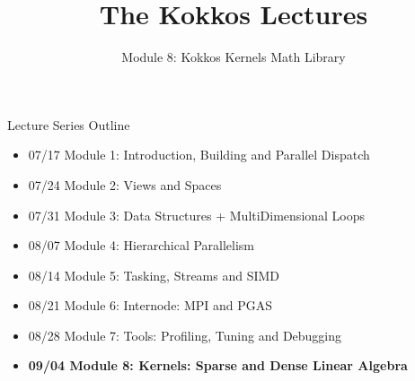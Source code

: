
\def\sandid{SAND2020-9315 TR}

\title{The Kokkos Lectures}

\author{Module 8: Kokkos Kernels Math Library}




\shortfalse
\mediumtrue
\fulltrue
\notoverviewtrue



\begin{frame}
	\titlepage
\end{frame}



\begin{frame}[fragile]{Lecture Series Outline}

\begin{itemize}
        \item 07/17 Module 1: Introduction, Building and Parallel Dispatch
        \item 07/24 Module 2: Views and Spaces
        \item 07/31 Module 3: Data Structures + MultiDimensional Loops
        \item 08/07 Module 4: Hierarchical Parallelism
        \item 08/14 Module 5: Tasking, Streams and SIMD
        \item 08/21 Module 6: Internode: MPI and PGAS
        \item 08/28 Module 7: Tools: Profiling, Tuning and Debugging
        \item \textbf{09/04 Module 8: Kernels: Sparse and Dense Linear Algebra}
\end{itemize}

\end{frame}

